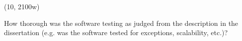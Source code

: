 (10, 2100w)

How thorough was the software testing as judged from the description in the
dissertation (e.g. was the software tested for exceptions, scalability, etc.)?
